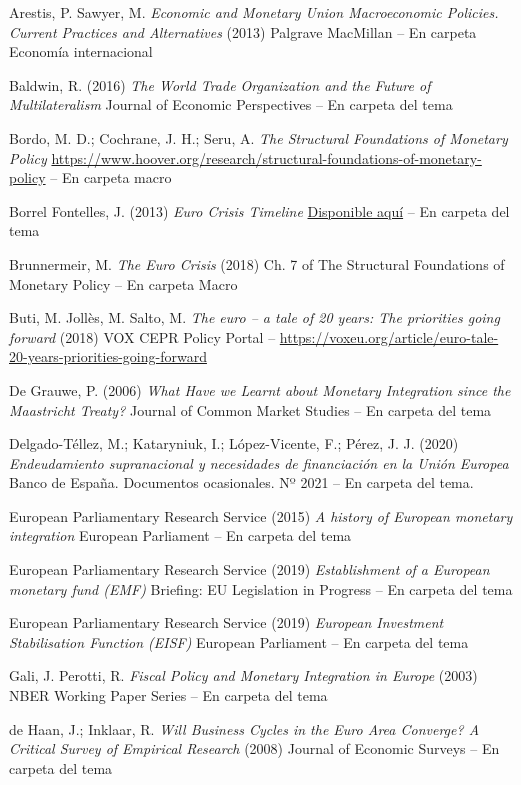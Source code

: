 \documentclass{nuevotema}
\begin{document}
Arestis, P. Sawyer, M. \textit{Economic and Monetary Union Macroeconomic Policies. Current Practices and Alternatives} (2013) Palgrave MacMillan -- En carpeta Economía internacional

Baldwin, R. (2016) \textit{The World Trade Organization and the Future of Multilateralism} Journal of Economic Perspectives -- En carpeta del tema

Bordo, M. D.; Cochrane, J. H.; Seru, A. \textit{The Structural Foundations of Monetary Policy} \url{https://www.hoover.org/research/structural-foundations-of-monetary-policy} -- En carpeta macro

Borrel Fontelles, J. (2013) \textit{Euro Crisis Timeline} \href{https://www.ucm.es/data/cont/docs/518-2015-04-15-TIMELINE%20OCT%202009%20MAYO%202013_ampliado.pdf}{Disponible aquí} -- En carpeta del tema

Brunnermeir, M. \textit{The Euro Crisis} (2018) Ch. 7 of The Structural Foundations of Monetary Policy -- En carpeta Macro

Buti, M. Jollès, M. Salto, M. \textit{The euro -- a tale of 20 years: The priorities going forward} (2018) VOX CEPR Policy Portal -- \url{https://voxeu.org/article/euro-tale-20-years-priorities-going-forward}

De Grauwe, P. (2006) \textit{What Have we Learnt about Monetary Integration since the Maastricht Treaty?} Journal of Common Market Studies -- En carpeta del tema

Delgado-Téllez, M.; Kataryniuk, I.; López-Vicente, F.; Pérez, J. J. (2020) \textit{Endeudamiento supranacional y necesidades de financiación en la Unión Europea} Banco de España. Documentos ocasionales. Nº 2021 -- En carpeta del tema.


European Parliamentary Research Service (2015) \textit{A history of European monetary integration} European Parliament -- En carpeta del tema

European Parliamentary Research Service (2019) \textit{Establishment of a European monetary fund (EMF)} Briefing: EU Legislation in Progress -- En carpeta del tema

European Parliamentary Research Service (2019) \textit{European Investment Stabilisation Function (EISF)} European Parliament -- En carpeta del tema

Gali, J. Perotti, R. \textit{Fiscal Policy and Monetary Integration in Europe} (2003) NBER Working Paper Series -- En carpeta del tema

de Haan, J.; Inklaar, R. \textit{Will Business Cycles in the Euro Area Converge? A Critical Survey of Empirical Research} (2008) Journal of Economic Surveys -- En carpeta del tema
\end{document}
